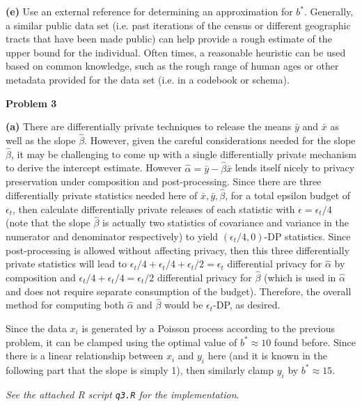 \documentclass[12pt]{article}
\begin{document}
\textbf{(e)} Use an external reference for determining an approximation for $b^*$. Generally, a similar public data set (i.e. past iterations of the census or different geographic tracts that have been made public) can help provide a rough estimate of the upper bound for the individual. Often times, a reasonable heuristic can be used based on common knowledge, such as the rough range of human ages or other metadata provided for the data set (i.e. in a codebook or schema).\\

\pagebreak

{\large\textbf{Problem 3}}

\textbf{(a)} There are differentially private techniques to release the means $\bar{y}$ and $\bar{x}$ as well as the slope $\hat{\beta}$. However, given the careful considerations needed for the slope $\hat{\beta}$, it may be challenging to come up with a single differentially private mechanism to derive the intercept estimate. However $\hat{\alpha} = \bar{y} - \hat{\beta}\bar{x}$ lends itself nicely to privacy preservation under composition and post-processing. Since there are three differentially private statistics needed here of $\bar{x}, \bar{y}, \hat{\beta}$, for a total epsilon budget of $\epsilon_t$, then calculate differentially private releases of each statistic with $\epsilon = \epsilon_t/4$ (note that the slope $\hat{\beta}$ is actually two statistics of covariance and variance in the numerator and denominator respectively) to yield $(\epsilon_t / 4,0)$-DP statistics. Since post-processing is allowed without affecting privacy, then this three differentially private statistics will lead to $\epsilon_t / 4 + \epsilon_t / 4 + \epsilon_t / 2 = \epsilon_t$ differential privacy for $\hat{\alpha}$ by composition and $\epsilon_t/4 + \epsilon_t/4 = \epsilon_t/2$ differential privacy for $\hat{\beta}$ (which is used in $\hat{\alpha}$ and does not require separate consumption of the budget). Therefore, the overall method for computing both $\hat{\alpha}$ and $\hat{\beta}$ would be $\epsilon_t$-DP, as desired.

Since the data $x_i$ is generated by a Poisson process according to the previous problem, it can be clamped using the optimal value of $b^*\approx 10$ found before. Since there is a linear relationship between $x_i$ and $y_i$ here (and it is known in the following part that the slope is simply 1), then similarly clamp $y_i$ by $b^* \approx 15$.

\emph{See the attached R script \texttt{q3.R} for the implementation}.\\
\end{document}

